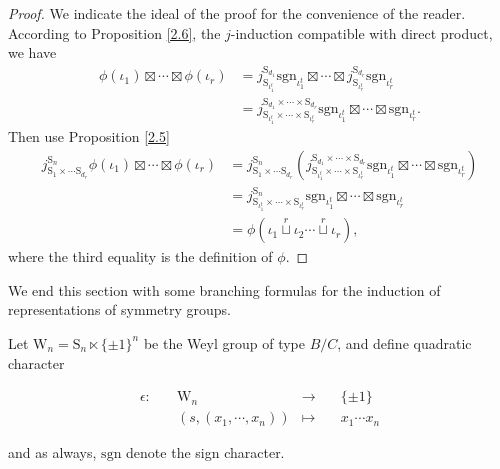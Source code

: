 \documentclass[12pt, a4paper]{amsart}
\numberwithin{equation}{section}
\newcommand{\sgn}{{\mathrm{sgn}}}
\newcommand{\defmap}[5]{
           \begin{equation*}
              \begin{aligned}
                   #1:\quad  & #2 &\longrightarrow &\quad #3 \\
                      \quad  & #4    &\longmapsto  &\quad #5
              \end{aligned}
           \end{equation*}
          }
\begin{document}
\begin{proof}
    We indicate the ideal of the proof for the convenience of the reader.
    According to Proposition \ref{2.6}, the $j$-induction compatible with direct product, we have
    \begin{align}
        \phi(\iota_1) \boxtimes \cdots \boxtimes \phi(\iota_r) & = j^{\mathrm{S}_{d_1}}_{\mathrm{S}_{\iota_{1}^t}}\sgn_{\iota_1^t} \boxtimes \cdots \boxtimes j^{\mathrm{S}_{d_r}}_{\mathrm{S}_{\iota_{r}^t}}\sgn_{\iota_r^t}\\
        & = j_{\mathrm{S}_{\iota_{1}^t} \times \cdots \times \mathrm{S}_{\iota_{r}^t}}^{\mathrm{S}_{d_1} \times \cdots \times \mathrm{S}_{d_r}}\sgn_{\iota_{1}^t} \boxtimes \cdots \boxtimes \sgn_{\iota_{r}^t}.
    \end{align}
    Then use Proposition \ref{2.5}
    \begin{align}
         j_{\mathrm{S}_1 \times \cdots \mathrm{S}_{d_r}}^{\mathrm{S}_n}\phi(\iota_1) \boxtimes \cdots \boxtimes \phi(\iota_r) & = j_{\mathrm{S}_1 \times \cdots \mathrm{S}_{d_r}}^{\mathrm{S}_n}(j_{\mathrm{S}_{\iota_{1}^t} \times \cdots \times \mathrm{S}_{\iota_{r}^t}}^{\mathrm{S}_{d_1} \times \cdots \times \mathrm{S}_{d_r}}\sgn_{\iota_{1}^t} \boxtimes \cdots \boxtimes \sgn_{\iota_{r}^t})\\
         & = j^{\mathrm{S}_n}_{\mathrm{S}_{\iota_{1}^t} \times \cdots \times \mathrm{S}_{\iota_{r}^t}}\sgn_{\iota_{1}^t} \boxtimes \cdots \boxtimes \sgn_{\iota_{r}^t}\\
         & = \phi(\iota_1 \mathop{\sqcup}\limits^r \iota_2 \cdots \mathop{\sqcup}\limits^r  \iota_r),
    \end{align}
    where the third equality is the definition of $\phi$.
\end{proof}

We end this section with some branching formulas for the induction of representations of symmetry groups. 

Let $\mathrm{W}_n = \mathrm{S}_{n} \ltimes \{\pm 1\}^n$ be the Weyl group of type $B/C$, and define quadratic character 
\defmap{\epsilon}{\mathrm{W}_n}{\{\pm 1\}}{(s,(x_1, \cdots, x_n))}{x_1\cdots x_n}
and as always, $\sgn$ denote the sign character.
\end{document}
